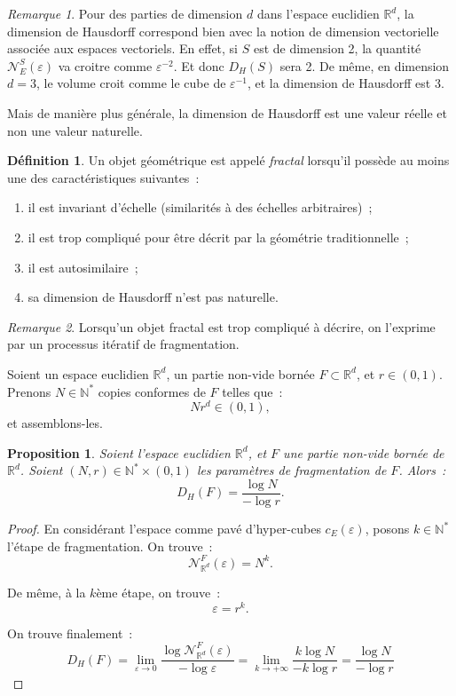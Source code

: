 \documentclass{article}
\newtheorem{prp}[thm]{Proposition}
\theoremstyle{definition}
\newtheorem{déf}[thm]{Définition}
\theoremstyle{remark}
\newtheorem*{rmq}{Remarque}
\newcommand{\N}{\mathbb N}
\newcommand{\R}{\mathbb R}
\begin{document}
	\begin{rmq} Pour des parties de dimension $d$ dans l'espace euclidien $\R^d$, la dimension de Hausdorff correspond bien avec la notion de dimension
	vectorielle associée aux espaces vectoriels. En effet, si $S$ est de dimension 2, la quantité $\mathcal N_E^S(\varepsilon)$ va croitre comme
	$\varepsilon^{-2}$. Et donc $D_H(S)$ sera 2. De même, en dimension $d=3$, le volume croit comme le cube de $\varepsilon^{-1}$, et la dimension de
	Hausdorff est 3.

	Mais de manière plus générale, la dimension de Hausdorff est une valeur réelle et non une valeur naturelle.
	\end{rmq}

	\begin{déf} Un objet géométrique est appelé \textit{fractal} lorsqu'il possède au moins une des caractéristiques suivantes~:
	\begin{enumerate}
		\item il est invariant d'échelle (similarités à des échelles arbitraires)~;
		\item il est trop compliqué pour être décrit par la géométrie traditionnelle~;
		\item il est autosimilaire~;
		\item sa dimension de Hausdorff n'est pas naturelle.
	\end{enumerate}
	\end{déf}

	\begin{rmq} Lorsqu'un objet fractal est trop compliqué à décrire, on l'exprime par un processus itératif de fragmentation.

	Soient un espace euclidien $\R^d$, un partie non-vide bornée $F \subset \R^d$, et $r \in (0, 1)$. Prenons $N \in \N^*$ copies conformes de $F$ telles que~:
	\[Nr^d \in (0, 1),\]
	et assemblons-les.
	\end{rmq}

	\begin{prp} Soient l'espace euclidien $\R^d$, et $F$ une partie non-vide bornée de $\R^d$. Soient $(N, r) \in \N^* \times (0, 1)$ les paramètres de
	fragmentation de $F$. Alors~:
	\[D_H(F) = \frac {\log N}{-\log r}.\]
	\end{prp}

	\begin{proof} En considérant l'espace comme pavé d'hyper-cubes $c_E(\varepsilon)$, posons $k \in \N^*$ l'étape de fragmentation. On trouve~:
	\[\mathcal N_{\R^d}^F(\varepsilon) = N^k.\]

	De même, à la $k$ème étape, on trouve~:
	\[\varepsilon = r^k.\]

	On trouve finalement~:
	\[D_H(F) = \lim_{\varepsilon \to 0}\frac {\log \mathcal N_{\R^d}^F(\varepsilon)}{-\log\varepsilon} = \lim_{k \to +\infty}\frac {k\log N}{-k\log r}
		= \frac {\log N}{-\log r}\]
	\end{proof}
\end{document}
